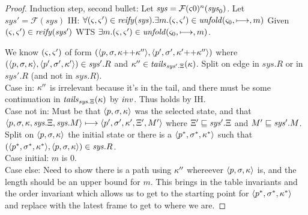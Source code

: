 \begin{proof}
  Induction step, second bullet:
Let $\mathit{sys} = {\mathcal F}(\varsigma0)^n(\mathit{sys}_0)$.
Let $\mathit{sys}' = {\mathcal F}(\mathit{sys})$
IH: $\forall (\varsigma,\varsigma') \in \mathit{reify}(\mathit{sys}). \exists m. (\varsigma,\varsigma') \in \mathit{unfold}(\varsigma_0,\longmapsto,m)$
Given $(\varsigma,\varsigma') \in \mathit{reify}(\mathit{sys}')$
WTS $\exists m. (\varsigma,\varsigma') \in \mathit{unfold}(\varsigma_0,\longmapsto,m)$.

We know $(\varsigma,\varsigma')$ of form $(\langle p,\sigma,\kappa {\tt ++} \kappa'' \rangle,\langle p',\sigma',\kappa' {\tt ++} \kappa'' \rangle)$ where
$(\langle p,\sigma,\kappa \rangle,\langle p',\sigma',\kappa' \rangle) \in \mathit{sys}'.R$ and $\kappa'' \in \mathit{tails}_{\mathit{sys}'.\Xi}(\kappa)$.
Split on edge in $\mathit{sys}.R$ or in $\mathit{sys}'.R$ (and not in $\mathit{sys}.R$).
\\
Case in: $\kappa''$ is irrelevant because it's in the tail, and there must be some continuation in $\mathit{tails}_{\mathit{sys}.\Xi}(\kappa)$ by $\mathit{inv}$.
         Thus holds by IH.
\\
Case not in:
  Must be that $\langle p,\sigma,\kappa \rangle$ was the selected state, and that
  $\langle p,\sigma,\kappa,\mathit{sys}.\Xi,\mathit{sys}.M \rangle \longmapsto \langle p',\sigma',\kappa',\Xi',M' \rangle$ where $\Xi' \sqsubseteq \mathit{sys}'.\Xi$ and $M' \sqsubseteq \mathit{sys}'.M$.
  Split on $\langle p,\sigma,\kappa \rangle$ the initial state or
           there is a $\langle p^*,\sigma^*,\kappa^* \rangle$ such that $(\langle p^*,\sigma^*,\kappa^* \rangle, \langle p,\sigma,\kappa \rangle) \in \mathit{sys}.R$.
\\
  Case initial: $m$ is 0.
\\
  Case else:
   Need to show there is a path using $\kappa''$ whereever $\langle p,\sigma,\kappa \rangle$ is, and the length should be an upper bound for $m$.
   This brings in the table invariants and the order invariant which allows us to get to the starting point for 
   $\langle p^*,\sigma^*,\kappa^* \rangle$ and replace with the latest frame to get to where we are.
\end{proof}